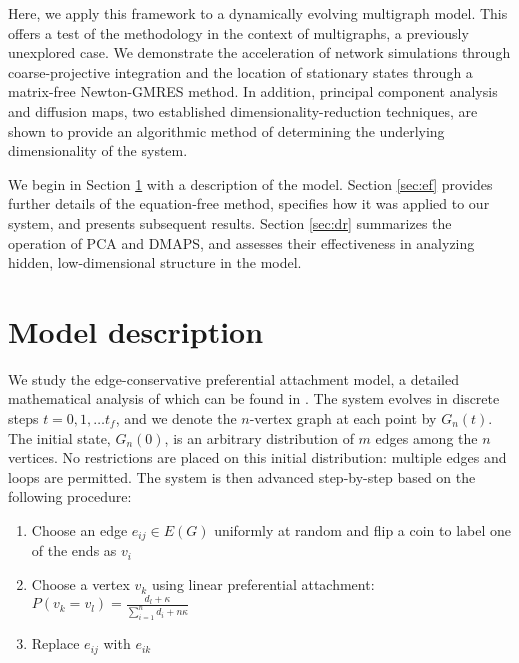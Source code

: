 \documentclass[epjST, final]{svjour}
\newcommand\ignore[1]{}
\begin{document}
\begin{onehalfspace}
Here, we apply this framework to a dynamically evolving multigraph model. This offers a test of the methodology in the context of multigraphs, a previously unexplored case. We demonstrate the acceleration of network simulations through coarse-projective integration and the location of stationary states through a matrix-free Newton-GMRES method. In addition, principal component analysis and diffusion maps, two established dimensionality-reduction techniques, are shown to provide an algorithmic method of determining the underlying dimensionality of the system. \par

We begin in Section \ref{sec:m} with a description of the model. Section \ref{sec:ef} provides further details of the equation-free method, specifies how it was applied to our system, and presents subsequent results. Section \ref{sec:dr} summarizes the operation of PCA and DMAPS, and assesses their effectiveness in analyzing hidden, low-dimensional structure in the model.

\section{Model description}
\label{sec:m}

We study the edge-conservative preferential attachment model, a detailed mathematical analysis of which can be found in \cite{rath_time_2009}. The system evolves in discrete steps $t = 0,1,\ldots t_f$, and we denote the $n$-vertex graph at each point by $G_n(t)$. The initial state, $G_n(0)$, is an arbitrary distribution of $m$ edges among the $n$ vertices. No restrictions are placed on this initial distribution: multiple edges and loops are permitted.\ignore{an Erd\H{o}s-R\'{e}nyi random graph on $n$ vertices and $m$ edges. Here, however, $m$ may be larger than the total number of edges in a completely-connected $n$-vertex graph so we cannot assign a probability to each edges existence, instead placing $m$ edges at random in the graph.} The system is then advanced step-by-step based on the following procedure:

\begin{enumerate}
\item Choose an edge $e_{ij} \in E(G)$ uniformly at random and flip a coin to label one of the ends as $v_{i}$
\item Choose a vertex $v_{k}$ using linear preferential attachment: $P(v_{k} = v_{l}) = \frac{d_{l} + \kappa}{\sum\limits_{i=1}^{n} d_{i} + n \kappa}$
\item Replace $e_{ij}$ with $e_{ik}$
\end{enumerate}


\end{onehalfspace}
\end{document}
